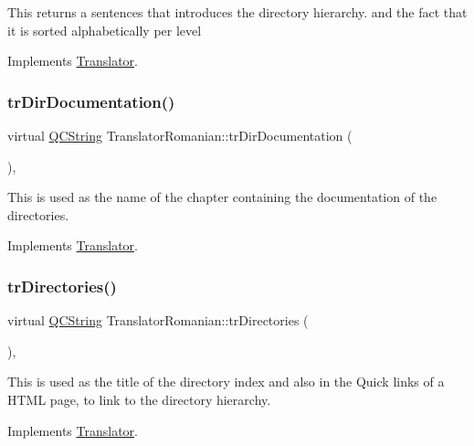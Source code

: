 This returns a sentences that introduces the directory hierarchy. and the fact that it is sorted alphabetically per level 

Implements \mbox{\hyperlink{class_translator}{Translator}}.

\mbox{\label{class_translator_romanian_adf9b6adbc83009c3759ed199131749d1}} 
\subsubsection{\texorpdfstring{trDirDocumentation()}{trDirDocumentation()}}
{\footnotesize\ttfamily virtual \mbox{\hyperlink{class_q_c_string}{Q\+C\+String}} Translator\+Romanian\+::tr\+Dir\+Documentation (\begin{DoxyParamCaption}{ }\end{DoxyParamCaption})\hspace{0.3cm}{\ttfamily [inline]}, {\ttfamily [virtual]}}

This is used as the name of the chapter containing the documentation of the directories. 

Implements \mbox{\hyperlink{class_translator}{Translator}}.

\mbox{\label{class_translator_romanian_a780ab33f21804f844fdddb452e0302dd}} 
\subsubsection{\texorpdfstring{trDirectories()}{trDirectories()}}
{\footnotesize\ttfamily virtual \mbox{\hyperlink{class_q_c_string}{Q\+C\+String}} Translator\+Romanian\+::tr\+Directories (\begin{DoxyParamCaption}{ }\end{DoxyParamCaption})\hspace{0.3cm}{\ttfamily [inline]}, {\ttfamily [virtual]}}

This is used as the title of the directory index and also in the Quick links of a H\+T\+ML page, to link to the directory hierarchy. 

Implements \mbox{\hyperlink{class_translator}{Translator}}.

